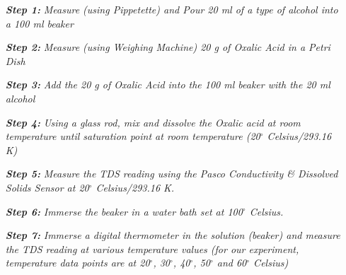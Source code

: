 \textit{}

\begin{enumerate}
    \item[\textbf{\textit{Step 1:}}] \textit{Measure (using Pippetette) and Pour 20 ml of a type of alcohol into a 100 ml beaker}
    \item[\textbf{\textit{Step 2:}}] \textit{Measure (using Weighing Machine) 20 g of Oxalic Acid in a Petri Dish}
    \item[\textbf{\textit{Step 3:}}] \textit{Add the 20 g of Oxalic Acid into the 100 ml beaker with the 20 ml alcohol}
    \item[\textbf{\textit{Step 4:}}] \textit{Using a glass rod, mix and dissolve the Oxalic acid at room temperature until saturation point at room temperature (20$^\circ$ Celsius/293.16 K)}
    \item[\textbf{\textit{Step 5:}}] \textit{Measure the TDS reading using the Pasco Conductivity & Dissolved Solids Sensor at 20$^\circ$ Celsius/293.16 K.}
    \item[\textbf{\textit{Step 6:}}] \textit{Immerse the beaker in a water bath set at 100$^\circ$ Celsius.}
    \item[\textbf{\textit{Step 7:}}] \textit{Immerse a digital thermometer in the solution (beaker) and measure the TDS reading at various temperature values (for our experiment, temperature data points are at 20$^\circ$, 30$^\circ$, 40$^\circ$, 50$^\circ$ and 60$^\circ$ Celsius)}
    \label{pro}
\end{enumerate}

